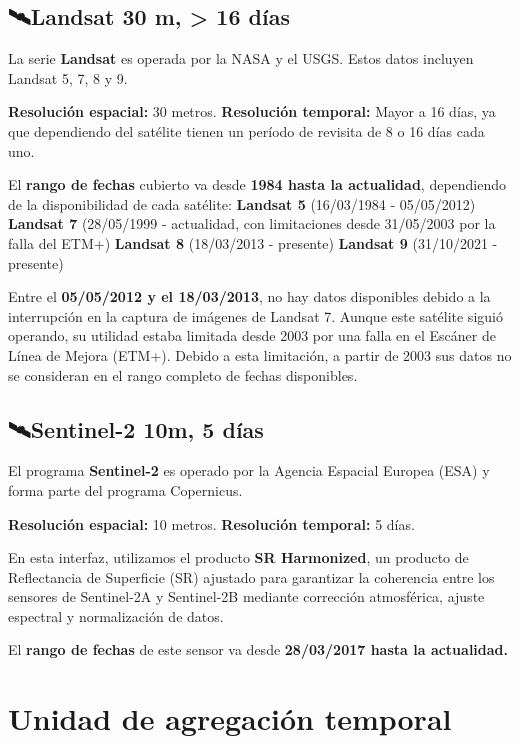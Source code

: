\documentclass[
]{book}
\begin{document}
\section{\texorpdfstring{\textbf{🛰️Landsat 30 m, \textgreater{} 16 días}}{🛰️Landsat 30 m, \textgreater{} 16 días}}\label{landsat-30-m-16-duxedas}

La serie \textbf{Landsat} es operada por la NASA y el USGS. Estos datos incluyen Landsat 5, 7, 8 y 9.

\textbf{Resolución espacial:} 30 metros.
\textbf{Resolución temporal:} Mayor a 16 días, ya que dependiendo del satélite tienen un período de revisita de 8 o 16 días cada uno.

El \textbf{rango de fechas} cubierto va desde \textbf{1984 hasta la actualidad}, dependiendo de la disponibilidad de cada satélite:
\textbf{Landsat 5} (16/03/1984 - 05/05/2012)
\textbf{Landsat 7} (28/05/1999 - actualidad, con limitaciones desde 31/05/2003 por la falla del ETM+)
\textbf{Landsat 8} (18/03/2013 - presente)
\textbf{Landsat 9} (31/10/2021 - presente)

Entre el \textbf{05/05/2012 y el 18/03/2013}, no hay datos disponibles debido a la interrupción en la captura de imágenes de Landsat 7. Aunque este satélite siguió operando, su utilidad estaba limitada desde 2003 por una falla en el Escáner de Línea de Mejora (ETM+). Debido a esta limitación, a partir de 2003 sus datos no se consideran en el rango completo de fechas disponibles.

\section{\texorpdfstring{\textbf{🛰️Sentinel-2 10m, 5 días}}{🛰️Sentinel-2 10m, 5 días}}\label{sentinel-2-10m-5-duxedas}

El programa \textbf{Sentinel-2} es operado por la Agencia Espacial Europea (ESA) y forma parte del programa Copernicus.

\textbf{Resolución espacial:} 10 metros.
\textbf{Resolución temporal:} 5 días.

En esta interfaz, utilizamos el producto \textbf{SR Harmonized}, un producto de Reflectancia de Superficie (SR) ajustado para garantizar la coherencia entre los sensores de Sentinel-2A y Sentinel-2B mediante corrección atmosférica, ajuste espectral y normalización de datos.

El \textbf{rango de fechas} de este sensor va desde \textbf{28/03/2017 hasta la actualidad.}

\chapter{Unidad de agregación temporal}\label{ud-agregacion-temporal}
\end{document}
